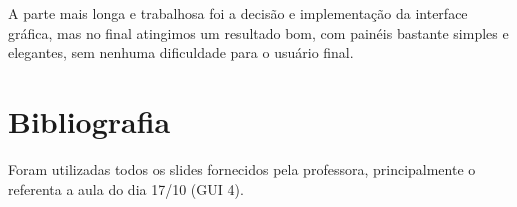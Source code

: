 \documentclass[
	article,			%
	11pt,				%
	oneside,			%
	a4paper,			%
	english,			%
	brazil,				%
	sumario=tradicional
	]{abntex2}
\begin{document}
A parte mais longa e trabalhosa foi a decisão e implementação da interface gráfica, mas no final atingimos um resultado bom, com painéis bastante simples e elegantes, sem nenhuma dificuldade para o usuário final.


\section*{Bibliografia}
Foram utilizadas todos os slides fornecidos pela professora, principalmente o referenta a aula do dia 17/10 (GUI 4).
\end{document}
